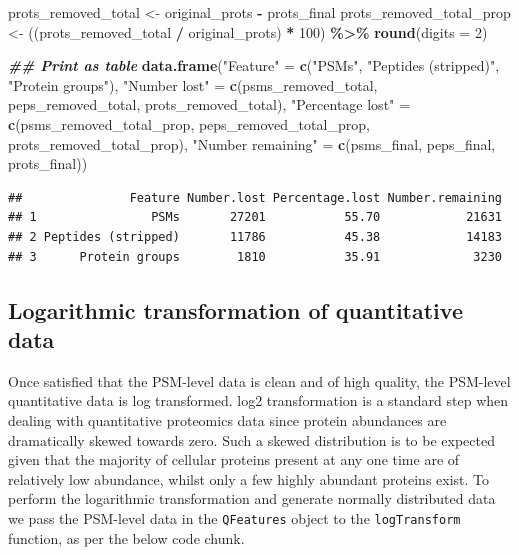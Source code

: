 \documentclass[9pt,a4paper,]{extarticle}
\newenvironment{Shaded}{\begin{snugshade}}{\end{snugshade}}
\newcommand{\AttributeTok}[1]{\textcolor[rgb]{0.13,0.29,0.53}{#1}}
\newcommand{\DecValTok}[1]{\textcolor[rgb]{0.00,0.00,0.81}{#1}}
\newcommand{\DocumentationTok}[1]{\textcolor[rgb]{0.56,0.35,0.01}{\textbf{\textit{#1}}}}
\newcommand{\FunctionTok}[1]{\textcolor[rgb]{0.13,0.29,0.53}{\textbf{#1}}}
\newcommand{\NormalTok}[1]{#1}
\newcommand{\OtherTok}[1]{\textcolor[rgb]{0.56,0.35,0.01}{#1}}
\newcommand{\SpecialCharTok}[1]{\textcolor[rgb]{0.81,0.36,0.00}{\textbf{#1}}}
\newcommand{\StringTok}[1]{\textcolor[rgb]{0.31,0.60,0.02}{#1}}
\begin{document}
\begin{Shaded}
\begin{Highlighting}[]
\NormalTok{prots\_removed\_total }\OtherTok{\textless{}{-}}\NormalTok{ original\_prots }\SpecialCharTok{{-}}\NormalTok{ prots\_final}
\NormalTok{prots\_removed\_total\_prop }\OtherTok{\textless{}{-}}\NormalTok{ ((prots\_removed\_total }\SpecialCharTok{/}\NormalTok{ original\_prots) }\SpecialCharTok{*} \DecValTok{100}\NormalTok{) }\SpecialCharTok{\%\textgreater{}\%}
  \FunctionTok{round}\NormalTok{(}\AttributeTok{digits =} \DecValTok{2}\NormalTok{)}

\DocumentationTok{\#\# Print as table}
\FunctionTok{data.frame}\NormalTok{(}\StringTok{"Feature"} \OtherTok{=} \FunctionTok{c}\NormalTok{(}\StringTok{"PSMs"}\NormalTok{,}
                         \StringTok{"Peptides (stripped)"}\NormalTok{,}
                         \StringTok{"Protein groups"}\NormalTok{),}
           \StringTok{"Number lost"} \OtherTok{=} \FunctionTok{c}\NormalTok{(psms\_removed\_total,}
\NormalTok{                             peps\_removed\_total,}
\NormalTok{                             prots\_removed\_total),}
           \StringTok{"Percentage lost"} \OtherTok{=} \FunctionTok{c}\NormalTok{(psms\_removed\_total\_prop,}
\NormalTok{                                 peps\_removed\_total\_prop,}
\NormalTok{                                 prots\_removed\_total\_prop),}
           \StringTok{"Number remaining"} \OtherTok{=} \FunctionTok{c}\NormalTok{(psms\_final,}
\NormalTok{                                  peps\_final,}
\NormalTok{                                  prots\_final))}
\end{Highlighting}
\end{Shaded}

\begin{verbatim}
##               Feature Number.lost Percentage.lost Number.remaining
## 1                PSMs       27201           55.70            21631
## 2 Peptides (stripped)       11786           45.38            14183
## 3      Protein groups        1810           35.91             3230
\end{verbatim}

\subsection{Logarithmic transformation of quantitative data}\label{logarithmic-transformation-of-quantitative-data}

Once satisfied that the PSM-level data is clean and of high quality, the PSM-level
quantitative data is log transformed. log2 transformation is a standard
step when dealing with quantitative proteomics data since protein abundances are
dramatically skewed towards zero. Such a skewed distribution is to be expected
given that the majority of cellular proteins present at any one time are of
relatively low abundance, whilst only a few highly abundant proteins exist. To
perform the logarithmic transformation and generate normally distributed data we
pass the PSM-level data in the \texttt{QFeatures} object to the \texttt{logTransform}
function, as per the below code chunk.
\end{document}
